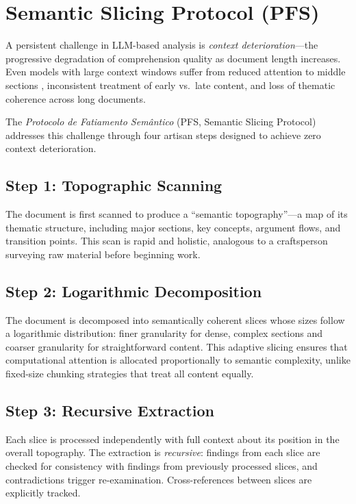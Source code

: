 \documentclass[11pt,a4paper]{article}
\begin{document}
\section{Semantic Slicing Protocol (PFS)}
\label{sec:pfs}

A persistent challenge in LLM-based analysis is \emph{context deterioration}---the progressive degradation of comprehension quality as document length increases. Even models with large context windows suffer from reduced attention to middle sections \citep{liu2024lost}, inconsistent treatment of early vs.\ late content, and loss of thematic coherence across long documents.

The \emph{Protocolo de Fatiamento Sem\^antico} (PFS, Semantic Slicing Protocol) addresses this challenge through four artisan steps designed to achieve zero context deterioration.

\subsection{Step 1: Topographic Scanning}

The document is first scanned to produce a ``semantic topography''---a map of its thematic structure, including major sections, key concepts, argument flows, and transition points. This scan is rapid and holistic, analogous to a craftsperson surveying raw material before beginning work.

\subsection{Step 2: Logarithmic Decomposition}

The document is decomposed into semantically coherent slices whose sizes follow a logarithmic distribution: finer granularity for dense, complex sections and coarser granularity for straightforward content. This adaptive slicing ensures that computational attention is allocated proportionally to semantic complexity, unlike fixed-size chunking strategies that treat all content equally.

\subsection{Step 3: Recursive Extraction}

Each slice is processed independently with full context about its position in the overall topography. The extraction is \emph{recursive}: findings from each slice are checked for consistency with findings from previously processed slices, and contradictions trigger re-examination. Cross-references between slices are explicitly tracked.
\end{document}
